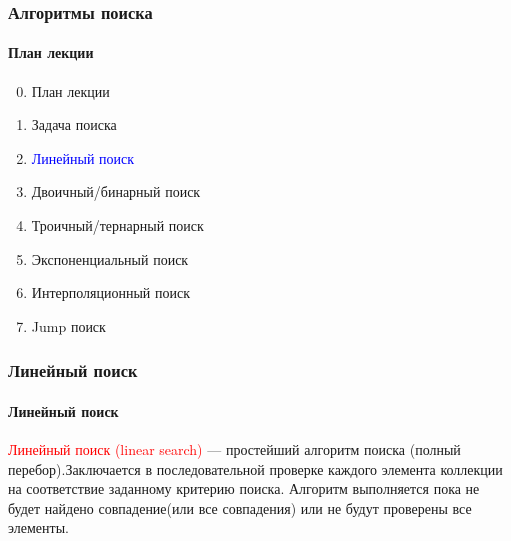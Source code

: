 \documentclass[aspectratio=169]{beamer}
\begin{document}
\begin{frame}
\frametitle{Алгоритмы поиска}
\framesubtitle{План лекции}

\begin{enumerate}
  \setcounter{enumi}{-1}
  \item{План лекции}
  \item{Задача поиска}
  \item{\textcolor{blue}{Линейный поиск}}
  \item{Двоичный/бинарный поиск}
  \item{Троичный/тернарный поиск}
  \item{Экспоненциальный поиск}
  \item{Интерполяционный поиск}
  \item{Jump поиск}
\end{enumerate}
\end{frame}


\begin{frame}
\frametitle{Линейный поиск}
\framesubtitle{Линейный поиск}
\justifying
\textcolor{red}{Линейный поиск (linear search)} — простейший алгоритм поиска (полный перебор).\newline\newline Заключается в последовательной проверке каждого элемента коллекции на \newline соответствие заданному критерию поиска. \newline\newline Алгоритм выполняется пока не будет найдено совпадение(или все совпадения) или не будут проверены все элементы.

\begin{figure}
    \captionsetup[subfigure]{labelformat=empty}
    \centering
\end{figure}
\end{frame}
\end{document}

